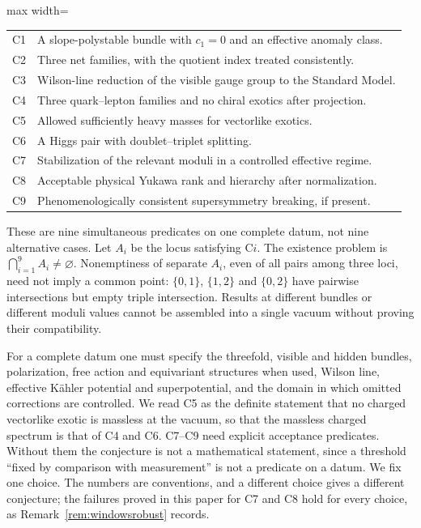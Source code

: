 \begin{center}\small
\begin{adjustbox}{max width=\linewidth}\begin{tabular}{@{}p{.07\linewidth}p{.85\linewidth}@{}}
\toprule
C1 & A slope-polystable bundle with $c_1=0$ and an effective anomaly class.\\
C2 & Three net families, with the quotient index treated consistently.\\
C3 & Wilson-line reduction of the visible gauge group to the Standard Model.\\
C4 & Three quark--lepton families and no chiral exotics after projection.\\
C5 & Allowed sufficiently heavy masses for vectorlike exotics.\\
C6 & A Higgs pair with doublet--triplet splitting.\\
C7 & Stabilization of the relevant moduli in a controlled effective regime.\\
C8 & Acceptable physical Yukawa rank and hierarchy after normalization.\\
C9 & Phenomenologically consistent supersymmetry breaking, if present.\\
\bottomrule
\end{tabular}\end{adjustbox}
\end{center}

These are nine simultaneous predicates on one complete datum, not nine
alternative cases. Let $A_i$ be the locus satisfying C$i$. The existence
problem is $\bigcap_{i=1}^9 A_i\ne\varnothing$. Nonemptiness of separate
$A_i$, even of all pairs among three loci, need not imply a common point:
$\{0,1\}$, $\{1,2\}$ and $\{0,2\}$ have pairwise intersections but empty
triple intersection. Results at different bundles or different moduli
values cannot be assembled into a single vacuum without proving their
compatibility.

For a complete datum one must specify the threefold, visible and hidden
bundles, polarization, free action and equivariant structures when used,
Wilson line, effective K\"ahler potential and superpotential, and the
domain in which omitted corrections are controlled. We read C5 as the
definite statement that no charged vectorlike exotic is massless at the
vacuum, so that the massless charged spectrum is that of C4 and C6.
C7--C9 need explicit acceptance predicates. Without them the conjecture is
not a mathematical statement, since a threshold ``fixed by comparison with
measurement'' is not a predicate on a datum. We fix one choice. The
numbers are conventions, and a different choice gives a different
conjecture; the failures proved in this paper for C7 and C8 hold for every
choice, as Remark~\ref{rem:windowsrobust} records.

